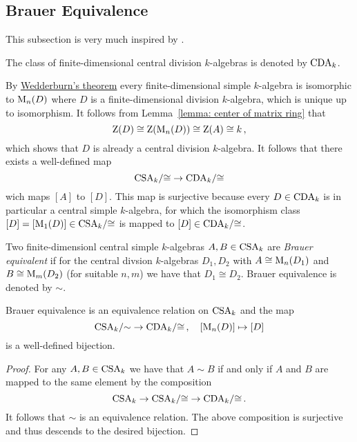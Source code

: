 \subsection{Brauer Equivalence}


\begin{fluff}
  This subsection is very much inspired by \cite[4.2]{Clark2012NonCA}.
\end{fluff}


\begin{notation}
  The class of finite-dimensional central division $k$-algebras is denoted by $\operatorname{CDA}_k$.
\end{notation}


\begin{fluff}
  By \hyperref[theorem: wedderburns theorem]{Wedderburn’s theorem} every finite-dimensional simple $k$-algebra is isomorphic to $\operatorname{M}_n(D)$ where $D$ is a finite-dimensional division $k$-algebra, which is unique up to isomorphism.
  It follows from Lemma~\ref{lemma: center of matrix ring} that
  \[
          \operatorname{Z}(D)
    \cong \operatorname{Z}(\operatorname{M}_n(D))
    \cong \operatorname{Z}(A)
    \cong k \,,
  \]
  which shows that $D$ is already a central division $k$-algebra.
  It follows that there exists a well-defined map
  \[
        \operatorname{CSA}_k\!/{\cong}
    \to \operatorname{CDA}_k\!/{\cong}
  \]
  wich maps $[A]$ to $[D]$.
  This map is surjective because every $D \in \operatorname{CDA}_k$ is in particular a central simple $k$-algebra, for which the isomorphism class $[D] = [\operatorname{M}_1(D)] \in \operatorname{CSA}_k\!/{\cong}$ is mapped to $[D] \in \operatorname{CDA}_k\!/{\cong}$.
\end{fluff}


\begin{definition}
  Two finite-dimensionl central simple $k$-algebras $A, B \in \operatorname{CSA}_k$ are \emph{Brauer equivalent} if for the central divsion $k$-algebras $D_1, D_2$ with $A \cong \operatorname{M}_n(D_1)$ and $B \cong \operatorname{M}_m(D_2)$ (for suitable $n, m$) we have that $D_1 \cong D_2$.
  Brauer equivalence is denoted by $\sim$.
\end{definition}


\begin{corollary}
  Brauer equivalence is an equivalence relation on $\operatorname{CSA}_k$ and the map
  \[
        \operatorname{CSA}_k\!/{\sim}
    \to \operatorname{CDA}_k\!/{\cong} \,,
    \quad   [\operatorname{M}_n(D)]
    \mapsto [D]
  \]
  is a well-defined bijection.
\end{corollary}


\begin{proof}
  For any $A, B \in \operatorname{CSA}_k$ we have that $A \sim B$ if and only if $A$ and $B$ are mapped to the same element by the composition
  \[
        \operatorname{CSA}_k
    \to \operatorname{CSA}_k\!/{\cong}
    \to \operatorname{CDA}_k\!/{\cong} \,.
  \]
  It follows that $\sim$ is an equivalence relation.
  The above composition is surjective and thus descends to the desired bijection.
\end{proof}


